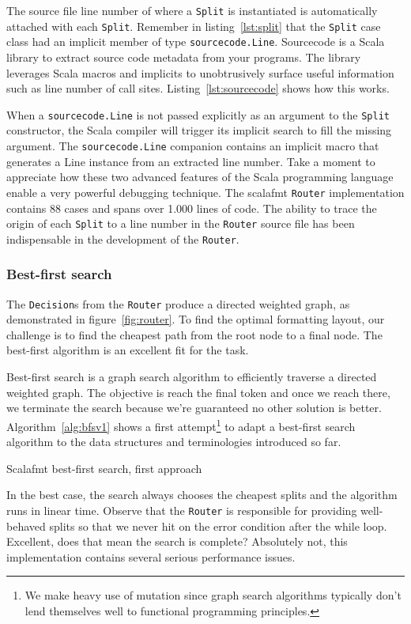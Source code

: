 The source file line number of where a \texttt{Split} is instantiated is automatically attached with each \texttt{Split}.
Remember in listing~\ref{lst:split} that the \texttt{Split} case class had an implicit member of type \texttt{sourcecode.Line}.
Sourcecode\autocite{lihao91:online} is a Scala library to extract source code metadata from your programs.
The library leverages Scala macros and implicits to unobtrusively surface useful information such as line number of call sites.
Listing~\ref{lst:sourcecode} shows how this works.

When a \texttt{sourcecode.Line} is not passed explicitly as an argument to the \texttt{Split} constructor, the Scala compiler will trigger its implicit search to fill the missing argument.
The \texttt{sourcecode.Line} companion contains an implicit macro that generates a Line instance from an extracted line number.
Take a moment to appreciate how these two advanced features of the Scala programming language enable a very powerful debugging technique.
The scalafmt \texttt{Router} implementation contains 88 cases and spans over 1.000 lines of code.
The ability to trace the origin of each \texttt{Split} to a line number in the \texttt{Router} source file has been indispensable in the development of the \texttt{Router}.

\subsubsection{Best-first search}
The \texttt{Decision}s from the \texttt{Router} produce a directed weighted graph, as demonstrated in figure~\ref{fig:router}.
To find the optimal formatting layout, our challenge is to find the cheapest path from the root node to a final node.
The best-first\autocite{pearl_heuristics:_1984} algorithm is an excellent fit for the task.

Best-first search is a graph search algorithm to efficiently traverse a directed weighted graph.
The objective is reach the final token and once we reach there, we terminate the search because we're guaranteed no other solution is better.
Algorithm~\ref{alg:bfsv1} shows a first attempt\footnote{
  We make heavy use of mutation since graph search algorithms typically don't lend themselves well to functional programming principles.
} to adapt a best-first search algorithm to the data structures and terminologies introduced so far.
\begin{algorithm}
  \caption{Scalafmt best-first search, first approach}\label{alg:bfsv1}
  
\end{algorithm}
In the best case, the search always chooses the cheapest splits and the algorithm runs in linear time.
Observe that the \texttt{Router} is responsible for providing well-behaved splits so that we never hit on the error condition after the while loop.
Excellent, does that mean the search is complete?
Absolutely not, this implementation contains several serious performance issues.

